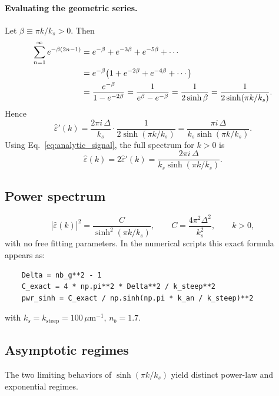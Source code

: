 \documentclass[11pt]{article}
\newcommand{\kk}{k_s}
\newcommand{\eps}{\varepsilon}
\newcommand{\epsh}{\hat{\varepsilon}}
\begin{document}
\paragraph{Evaluating the geometric series.}
Let $\beta \equiv \pi k/\kk > 0$.  Then
\begin{align}
    \sum_{n=1}^{\infty} e^{-\beta(2n-1)}
    &= e^{-\beta} + e^{-3\beta} + e^{-5\beta} + \cdots \notag\\
    &= e^{-\beta}\bigl(1 + e^{-2\beta} + e^{-4\beta}+\cdots\bigr) \notag\\
    &= \frac{e^{-\beta}}{1 - e^{-2\beta}}
     = \frac{1}{e^{\beta} - e^{-\beta}}
     = \frac{1}{2\sinh\beta}
     = \frac{1}{2\sinh(\pi k/\kk)}.
\end{align}
Hence
\begin{equation}
    \hat{\eps}'(k) = \frac{2\pi i\,\Delta}{\kk}
        \cdot\frac{1}{2\sinh(\pi k/\kk)}
    = \frac{\pi i\,\Delta}{\kk\sinh(\pi k/\kk)}.
\end{equation}
Using Eq.~\eqref{eq:analytic_signal}, the full spectrum for $k>0$ is
\begin{equation}\label{eq:log_epsh}
    \epsh(k) = 2\hat{\eps}'(k) = \frac{2\pi i\,\Delta}{\kk\sinh(\pi k/\kk)}.
\end{equation}

\subsection{Power spectrum}

\begin{equation}\label{eq:log_power}
    \boxed{|\epsh(k)|^2 = \frac{C}{\sinh^2(\pi k/\kk)},
    \qquad
    C = \frac{4\pi^2\Delta^2}{\kk^2},
    \qquad k>0,}
\end{equation}
with no free fitting parameters.  In the numerical scripts this exact formula
appears as:
\begin{verbatim}
    Delta = nb_g**2 - 1
    C_exact = 4 * np.pi**2 * Delta**2 / k_steep**2
    pwr_sinh = C_exact / np.sinh(np.pi * k_an / k_steep)**2
\end{verbatim}
with $\kk = k_{\text{steep}} = 100\,\mu\mathrm{m}^{-1}$, $n_b=1.7$.

\subsection{Asymptotic regimes}

The two limiting behaviors of $\sinh(\pi k/\kk)$ yield distinct power-law
and exponential regimes.
\end{document}
